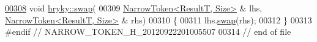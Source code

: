 \begin{DoxyCode}
\hypertarget{narrow__token_8h_source_l00308}{}\hyperlink{namespacehryky_ae6f86b24f33103abda6e0c6a57406d9d}{00308} \textcolor{keywordtype}{void} \hyperlink{namespacehryky_a4282146df5ea2b68cb667896a2205909}{hryky::swap}(
00309     \hyperlink{classhryky_1_1_narrow_token}{NarrowToken<ResultT, Size>} & lhs, \hyperlink{classhryky_1_1_narrow_token}{NarrowToken<ResultT, Size>} & rhs)
00310 \{
00311     lhs.\hyperlink{classhryky_1_1_narrow_token_a141661722b4c90ec9699fd9511c612ab}{swap}(rhs);
00312 \}
00313 \textcolor{preprocessor}{#endif // NARROW\_TOKEN\_H\_20120922201005507}
00314 \textcolor{preprocessor}{}\textcolor{comment}{// end of file}
\end{DoxyCode}
